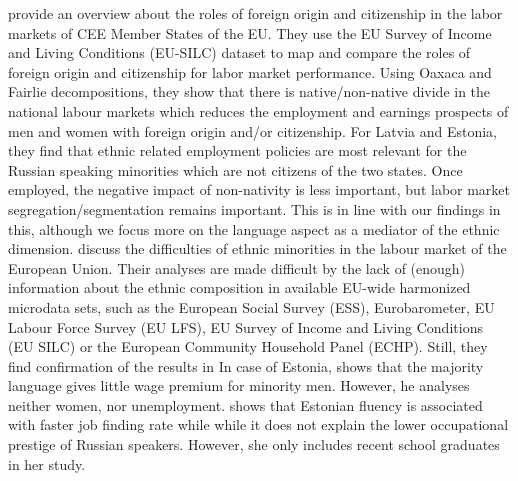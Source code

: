 \documentclass[12pt, a4paper]{article}
\begin{document}
\cite{Kahanec2009} provide an overview about the roles of foreign origin and citizenship in the labor markets of CEE Member States of the EU. 
 They use the EU Survey of Income and Living Conditions (EU-SILC) dataset to  map and compare the roles of foreign origin and citizenship for labor market performance.
Using Oaxaca and Fairlie decompositions, they show that there is native/non-native divide in the national labour markets which reduces the employment and earnings prospects of men and women with foreign origin and/or citizenship.
For Latvia and Estonia, they find that ethnic related employment policies are most relevant for the Russian speaking minorities which are not citizens of the two states. Once employed, the negative impact of non-nativity is less important, but labor market segregation/segmentation remains important.
This is in line with our findings in this, although we focus more on the language aspect as a mediator of the ethnic dimension.
\cite{Kahanec2010} discuss the difficulties of ethnic minorities in the labour market of the European Union.
Their analyses are made difficult by the lack of (enough) information about the ethnic composition in available EU-wide harmonized microdata sets, such as the
European Social Survey (ESS), Eurobarometer, EU Labour Force Survey (EU LFS), EU
Survey of Income and Living Conditions (EU SILC) or the European Community
Household Panel (ECHP). 
Still, they find confirmation of the results in \cite{Kahanec2009}
In case of Estonia,
\citet{Toomet2011} shows that the majority language gives little wage
premium for minority men.  However, he analyses neither women, nor
unemployment.  \citet{Lindemann2013} shows that Estonian fluency
is associated with faster job finding rate while while it does not
explain the lower occupational prestige of Russian speakers.  However,
she only includes recent school graduates in her study.
\end{document}
